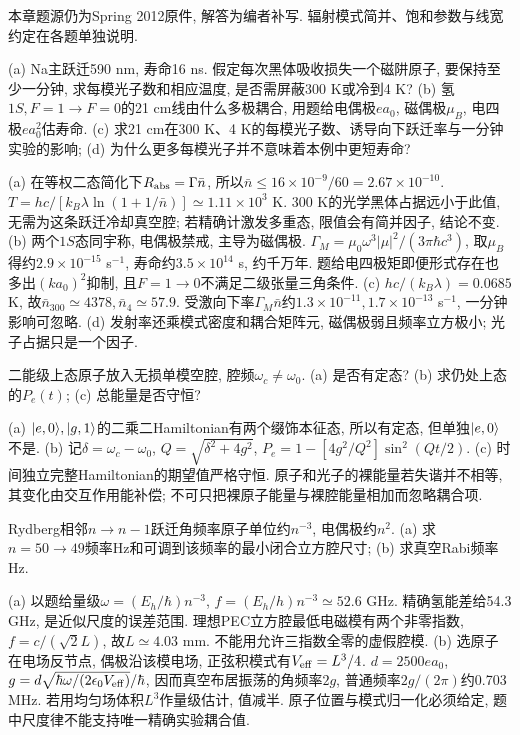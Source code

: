 本章题源仍为Spring 2012原件, 解答为编者补写. 辐射模式简并、饱和参数与线宽约定在各题单独说明.
\begin{exercise}(a) Na主跃迁590 nm, 寿命16 ns. 假定每次黑体吸收损失一个磁阱原子, 要保持至少一分钟, 求每模光子数和相应温度, 是否需屏蔽300 K或冷到4 K? (b) 氢$1S,F=1\to F=0$的21 cm线由什么多极耦合, 用题给电偶极$ea_0$, 磁偶极$\mu_B$, 电四极$ea_0^2$估寿命. (c) 求21 cm在300 K、4 K的每模光子数、诱导向下跃迁率与一分钟实验的影响; (d) 为什么更多每模光子并不意味着本例中更短寿命?\end{exercise}
\begin{solution}(a) 在等权二态简化下$R_{\rm abs}=\Gamma\bar n$, 所以$\bar n\le16\times10^{-9}/60=2.67\times10^{-10}$. $T=hc/[k_B\lambda\ln(1+1/\bar n)]\simeq1.11\times10^3$ K. 300 K的光学黑体占据远小于此值, 无需为这条跃迁冷却真空腔; 若精确计激发多重态, 限值会有简并因子, 结论不变. (b) 两个$1S$态同宇称, 电偶极禁戒, 主导为磁偶极. $\Gamma_M=\mu_0\omega^3|\mu|^2/(3\pi\hbar c^3)$, 取$\mu_B$得约$2.9\times10^{-15}$ s$^{-1}$, 寿命约$3.5\times10^{14}$ s, 约千万年. 题给电四极矩即便形式存在也多出$(ka_0)^2$抑制, 且$F=1\to0$不满足二级张量三角条件. (c) $hc/(k_B\lambda)=0.0685$ K, 故$\bar n_{300}\simeq4378,\bar n_4\simeq57.9$. 受激向下率$\Gamma_M\bar n$约$1.3\times10^{-11},1.7\times10^{-13}$ s$^{-1}$, 一分钟影响可忽略. (d) 发射率还乘模式密度和耦合矩阵元, 磁偶极弱且频率立方极小; 光子占据只是一个因子.
\end{solution}
\begin{exercise}二能级上态原子放入无损单模空腔, 腔频$\omega_c\ne\omega_0$. (a) 是否有定态? (b) 求仍处上态的$P_e(t)$; (c) 总能量是否守恒?\end{exercise}
\begin{solution}(a) $\lvert e,0\rangle,\lvert g,1\rangle$的二乘二Hamiltonian有两个缀饰本征态, 所以有定态, 但单独$\lvert e,0\rangle$不是. (b) 记$\delta=\omega_c-\omega_0$, $Q=\sqrt{\delta^2+4g^2}$, $P_e=1-[4g^2/Q^2]\sin^2(Qt/2)$. (c) 时间独立完整Hamiltonian的期望值严格守恒. 原子和光子的裸能量若失谐并不相等, 其变化由交互作用能补偿; 不可只把裸原子能量与裸腔能量相加而忽略耦合项.
\end{solution}
\begin{exercise}Rydberg相邻$n\to n-1$跃迁角频率原子单位约$n^{-3}$, 电偶极约$n^2$. (a) 求$n=50\to49$频率Hz和可调到该频率的最小闭合立方腔尺寸; (b) 求真空Rabi频率Hz.\end{exercise}
\begin{solution}(a) 以题给量级$\omega=(E_h/\hbar)n^{-3}$, $f=(E_h/h)n^{-3}\simeq52.6$ GHz. 精确氢能差给54.3 GHz, 是近似尺度的误差范围. 理想PEC立方腔最低电磁模有两个非零指数, $f=c/(\sqrt2L)$, 故$L\simeq4.03$ mm. 不能用允许三指数全零的虚假腔模. (b) 选原子在电场反节点, 偶极沿该模电场, 正弦积模式有$V_{\rm eff}=L^3/4$. $d=2500ea_0$, $g=d\sqrt{\hbar\omega/(2\epsilon_0V_{\rm eff})}/\hbar$, 因而真空布居振荡的角频率$2g$, 普通频率$2g/(2\pi)$约0.703 MHz. 若用均匀场体积$L^3$作量级估计, 值减半. 原子位置与模式归一化必须给定, 题中尺度律不能支持唯一精确实验耦合值.
\end{solution}

